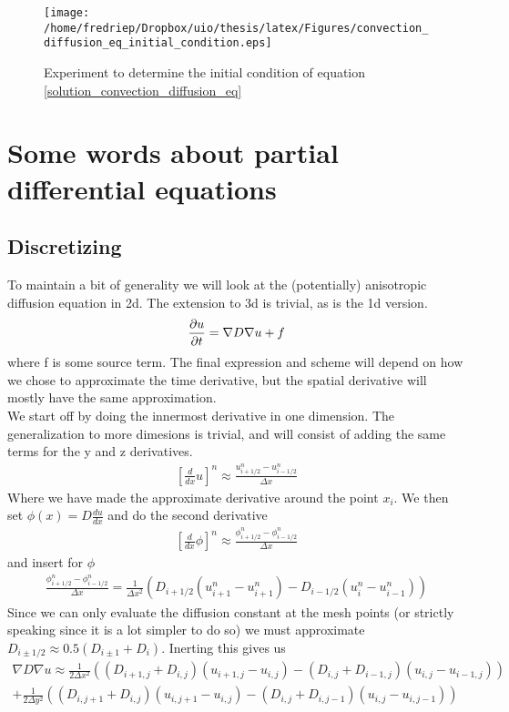 \begin{figure}[H]
 \centering
 \texttt{[image: /home/fredriep/Dropbox/uio/thesis/latex/Figures/convection\_diffusion\_eq\_initial\_condition.eps]}
 \caption[Initial condition for convection diffusion]{Experiment to determine the initial condition of equation \ref{solution_convection_diffusion_eq}}
 \label{convection_diffusion_eq_initial_condition}
\end{figure}


\section{Some words about partial differential equations}\label{some_words_on_PDEs}
\subsection{Discretizing}\label{discretizing}

To maintain a bit of generality we will look at the (potentially) anisotropic diffusion equation in 2d. The extension to 3d is trivial, as is the 1d version.
\begin{equation}
 \frac{\partial u}{\partial t} = \nabla D\nabla u +f
\end{equation}
where f is some source term. 
The final expression and scheme will depend on how we chose to approximate the time derivative, but the spatial derivative will mostly have the same approximation. \\
We start off by doing the innermost derivative in one dimension. 
The generalization to more dimesions is trivial, and will consist of adding the same terms for the y and z derivatives. 
\begin{align*}
 \left[\frac{d}{dx}u\right]^n \approx \frac{u^n_{i+1/2}-u^n_{i-1/2}}{\Delta x}
\end{align*}
Where we have made the approximate derivative around the point $x_i$. 
We then set $\phi(x)=D\frac{du}{dx}$ and do the second derivative
\begin{align*}
  \left[\frac{d}{dx}\phi\right]^n \approx \frac{\phi^n_{i+1/2}-\phi^n_{i-1/2}}{\Delta x}
\end{align*}
and insert for $\phi$
\begin{align*}
 \frac{\phi^n_{i+1/2}-\phi^n_{i-1/2}}{\Delta x} = \frac{1}{\Delta x^2}\left(D_{i+1/2}(u^n_{i+1}-u^n_{i+1}) -D_{i-1/2}(u^n_{i}-u^n_{i-1})\right)
\end{align*}
Since we can only evaluate the diffusion constant at the mesh points (or strictly speaking since it is a lot simpler to do so) we must approximate $D_{i\pm1/2}\approx0.5(D_{i\pm1}+D_i)$. 
Inerting this gives us 
\begin{align*}
 \nabla D\nabla u\approx\frac{1}{2\Delta x^2}\left((D_{i+1,j}+D_{i,j})(u_{i+1,j}-u_{i,j})-(D_{i,j}+D_{i-1,j})(u_{i,j}-u_{i-1,j})\right) \\
 +\frac{1}{2\Delta y^2}\left((D_{i,j+1}+D_{i,j})(u_{i,j+1}-u_{i,j})-(D_{i,j}+D_{i,j-1})(u_{i,j}-u_{i,j-1})\right)
\end{align*}

